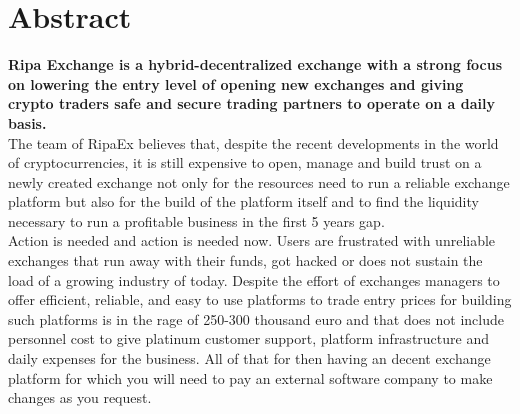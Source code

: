 \documentclass[11pt,fleqn,oneside]{book} %
\begin{document}
\begingroup
\thispagestyle{empty}
\endgroup

\pagestyle{empty} %
\usechapterimagefalse %
\chapter{Abstract}
\textbf{Ripa Exchange is a hybrid-decentralized exchange with a strong focus on lowering the entry level
of opening new exchanges and giving crypto traders safe and secure trading partners to operate on a daily basis.}\\

The team of RipaEx believes that, despite the recent developments in the world of
cryptocurrencies, it is still expensive to open, manage and build trust on a newly created exchange not
only for the resources need to run a reliable exchange platform but also for the build of the platform 
itself and to find the liquidity necessary to run a profitable business in the first 5 years gap.\\

Action is needed and action is needed now. Users are frustrated with unreliable exchanges that run away
with their funds, got hacked or does not sustain the load of a growing industry of today. Despite
the effort of exchanges managers to offer efficient, reliable, and easy to use platforms to trade entry
prices for building such platforms is in the rage of 250-300 thousand euro and that does not 
include personnel cost to give platinum customer support, platform infrastructure and daily expenses for
the business. All of that for then having an decent exchange platform for which you will need to pay an 
external software company to make changes as you request.\\
\end{document}
